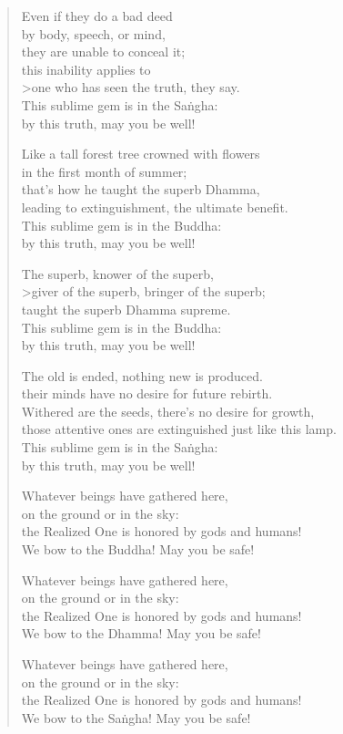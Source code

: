 \documentclass[12pt,openany]{book}%
\begin{document}
\begin{verse}
Even if they do a bad deed \\
by body, speech, or mind, \\
they are unable to conceal it; \\
this inability applies to \\>one who has seen the truth, they say. \\
This sublime gem is in the \textsanskrit{Saṅgha}: \\
by this truth, may you be well! 

Like a tall forest tree crowned with flowers \\
in the first month of summer; \\
that’s how he taught the superb Dhamma, \\
leading to extinguishment, the ultimate benefit. \\
This sublime gem is in the Buddha: \\
by this truth, may you be well! 

The superb, knower of the superb, \\>giver of the superb, bringer of the superb; \\
taught the superb Dhamma supreme. \\
This sublime gem is in the Buddha: \\
by this truth, may you be well! 

The old is ended, nothing new is produced. \\
their minds have no desire for future rebirth. \\
Withered are the seeds, there’s no desire for growth, \\
those attentive ones are extinguished just like this lamp. \\
This sublime gem is in the \textsanskrit{Saṅgha}: \\
by this truth, may you be well! 

Whatever beings have gathered here, \\
on the ground or in the sky: \\
the Realized One is honored by gods and humans! \\
We bow to the Buddha! May you be safe! 

Whatever beings have gathered here, \\
on the ground or in the sky: \\
the Realized One is honored by gods and humans! \\
We bow to the Dhamma! May you be safe! 

Whatever beings have gathered here, \\
on the ground or in the sky: \\
the Realized One is honored by gods and humans! \\
We bow to the \textsanskrit{Saṅgha}! May you be safe! 

%
\end{verse}
\end{document}
